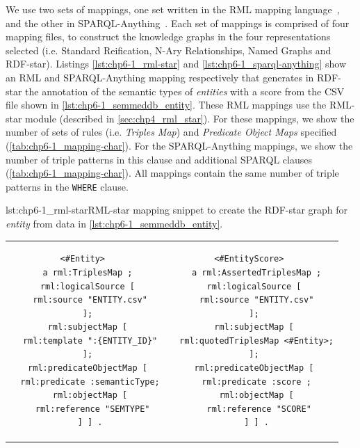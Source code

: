 We use two sets of mappings, one set written in the RML mapping language~\parencite{iglesias2023rml}, and the other in SPARQL-Anything~\parencite{asprino2023sparql-anything}. Each set of mappings is comprised of four mapping files, to construct the knowledge graphs in the four representations selected (i.e. Standard Reification, N-Ary Relationships, Named Graphs and RDF-star).
Listings \ref{lst:chp6-1_rml-star} and \ref{lst:chp6-1_sparql-anything} show an RML and SPARQL-Anything mapping respectively that generates in RDF-star the annotation of the semantic types of \textit{entities} with a score from the CSV file shown in \cref{lst:chp6-1_semmeddb_entity}. These RML mappings use the RML-star module (described in \cref{sec:chp4_rml_star}). For these mappings, we show the number of sets of rules (i.e. \textit{Triples Map}) and  \textit{Predicate Object Maps} specified (\cref{tab:chp6-1_mapping-char}). For the SPARQL-Anything mappings, we show the number of triple patterns in this clause and additional SPARQL clauses (\cref{tab:chp6-1_mapping-char}). All mappings contain the same number of triple patterns in the \texttt{WHERE} clause.



\noindent\begin{minipage}{1\linewidth}
\begin{captionedlisting}{lst:chp6-1_rml-star}{RML-star mapping snippet to create the RDF-star graph for \textit{entity} from data in \cref{lst:chp6-1_semmeddb_entity}. }
\centering
\begin{tabular}{cc}
{\begin{lstlisting}[basicstyle=\ttfamily\small,label={list:example1}]
<#Entity> 
 a rml:TriplesMap ;
 rml:logicalSource [
  rml:source "ENTITY.csv"
 ];
 rml:subjectMap [
  rml:template ":{ENTITY_ID}"
 ];
 rml:predicateObjectMap [
  rml:predicate :semanticType;
  rml:objectMap [
   rml:reference "SEMTYPE"
  ] ] .
\end{lstlisting}}
&
{\begin{lstlisting}[basicstyle=\ttfamily\small,label={list:example1},numbers=right,firstnumber=13]
<#EntityScore> 
  a rml:AssertedTriplesMap ;
 rml:logicalSource [
  rml:source "ENTITY.csv"
 ];
 rml:subjectMap [
  rml:quotedTriplesMap <#Entity>;
 ];
 rml:predicateObjectMap [
  rml:predicate :score ;
  rml:objectMap [
   rml:reference "SCORE"
  ] ] .
\end{lstlisting}}

\end{tabular}
\end{captionedlisting}
\end{minipage}


